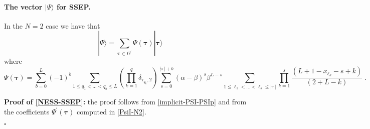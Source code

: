 \documentclass[10pt]{article}
\numberwithin{equation}{section}
\numberwithin{equation}{subsection}
\newcommand{\dt}{\;.}
\begin{document}
\paragraph{The vector $|\Psi\rangle$ for SSEP.}
In the {\color{blue} $N=2$} case we have that 
\begin{equation}\label{NESS-SSEP}
	|\Psi\rangle=\sum_{\bm{\tau}\in \Omega^{'}}\Psi(\bm{\tau})|\bm{\tau}\rangle
\end{equation}
where
\begin{equation}
	\Psi(\bm{\tau})=\sum_{b=0}^{L}(-1)^{b}\sum_{1\leq q_{1}<\ldots<q_{b}\leq L}\left(\prod_{k=1}^{q}\delta_{\tau_{q_{k}},2}\right)\sum_{s=0}^{|\bm{\tau}|+b}(\alpha-\beta)^{s}\beta^{L-s}\sum_{1\leq \ell_{1}<\ldots<\ell_{s}\leq |\bm{\tau}|}\prod_{k=1}^{s}\frac{\left(L+1-x_{\ell_{k}}-s+k\right)}{(2+L-k)}\dt
\end{equation}

\textbf{Proof of \eqref{NESS-SSEP}:} the proof follows from \eqref{implicit-PSI-PSIp} and from the coefficients $\Psi^{'}(\bm{\tau})$ computed in \eqref{PsiI-N2}. 
\begin{flushright}
	$\square$
\end{flushright}
\end{document}
